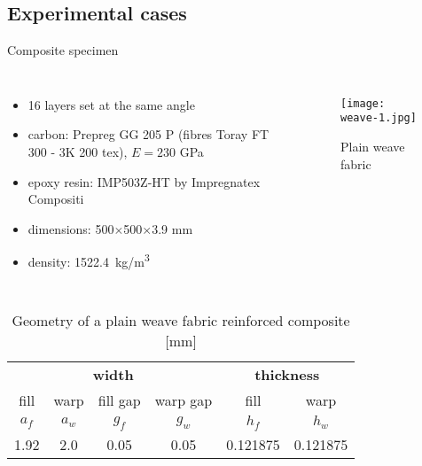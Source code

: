 \documentclass[10pt,aspectratio=169,dvipsnames]{beamer} %
\newcounter{angle}
\begin{document}
		\subsection{Experimental cases}
		\begin{frame}[t]{Composite specimen}
			\begin{columns}[T]
				{\small
					\begin{itemize}
						\item 16 layers set at the same angle \\
						\item carbon: Prepreg GG 205  P (fibres Toray FT 300 - 3K 200 tex), $E=230$ GPa
						\item epoxy resin: IMP503Z-HT by Impregnatex Compositi 
						\item dimensions: 500$\times$500$\times$3.9 mm\\
						\item density: 1522.4~kg/m\textsuperscript{3}
					\end{itemize}
				}
				\begin{figure}
					\texttt{[image: weave-1.jpg]}
					\caption{Plain weave fabric}
				\end{figure}
			\end{columns}
			\begin{table}[h]
				\renewcommand{\arraystretch}{1.1}
				\centering \footnotesize
				\caption{Geometry of a plain weave fabric reinforced composite [mm]}
				\begin{tabular}{cccccc} 
					\toprule
					\multicolumn{4}{c}{\textbf{width} }	& \multicolumn{2}{c}{\textbf{thickness} }  \\ 
					\cmidrule(lr){1-4} \cmidrule(lr){5-6} 
					fill & warp & fill gap& warp gap& fill & warp\\
					$a_f$ &$a_w$& $g_f$  & $g_w$  & $h_f$& $h_w$ \\ 
					\cmidrule(lr){1-2} \cmidrule(lr){3-4} \cmidrule(lr){5-6}
					1.92 &2.0& 0.05& 0.05 & 0.121875 & 0.121875 \\
					\bottomrule 
				\end{tabular} 
				\label{tab:weave_geo}
			\end{table}
		\end{frame}
\end{document}
